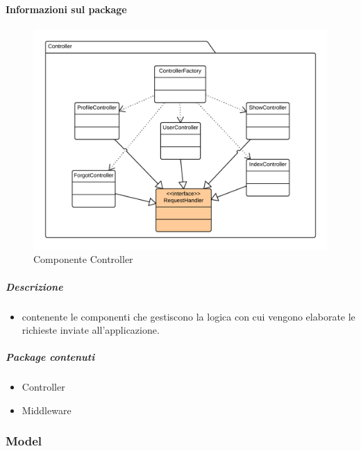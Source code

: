   \paragraph{Informazioni sul package} 
    \begin{figure}[H] 
      \begin{center} 
        \includegraphics[width=\textwidth]{uml/package/Back-end::Lib::Controller.png}  
        \caption{Componente Controller}
      \end{center}  
    \end{figure} 
  \subparagraph{Descrizione} 
    \begin{itemize}
    \item[]  contenente le componenti che gestiscono la logica con cui vengono elaborate le richieste inviate all’applicazione.
    \end{itemize} 
    \subparagraph{Package contenuti} 
    \begin{itemize}
        \item Controller
        \item Middleware
    \end{itemize}
  \subsubsection{Model}

